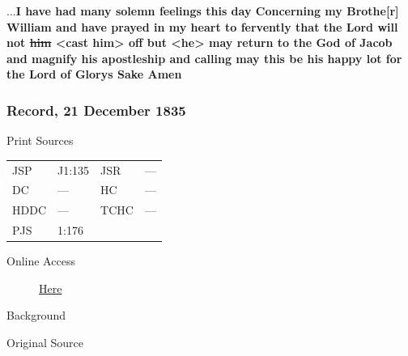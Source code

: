 				...\textbf{I have had many solemn feelings this day Concerning my Brothe[r] William and have prayed in my heart to fervently that the Lord will not \sout{him} <cast him> off but <he> may return to the God of Jacob and magnify his apostleship and calling may this be his happy lot for the Lord of Glorys Sake Amen}
				
		\subsubsection{Record, 21 December 1835}
			\label{EMS-1835-JS-21-DEC-1835}
			
			\begin{description}
				\item[Print Sources]
			\end{description}

				\begin{tabular}{p{0.5in}p{1in}p{0.5in}p{1in}}
				JSP	 	& J1:135		& JSR 		& --- \\
				DC	 	& --- 				& HC 		& --- \\
				HDDC 	& ---				& TCHC 		& --- \\
				PJS 	& 1:176				& 	 		&  \\
				\end{tabular}
			
			\begin{description}
				\item[Online Access] \href{https://www.josephsmithpapers.org/paper-summary/journal-1835-1836/89}{Here}
			\end{description}
			
			\begin{description}
				\item[Background]
			\end{description}
			
			
			\begin{description}
				\item[Original Source]
			\end{description}
			
